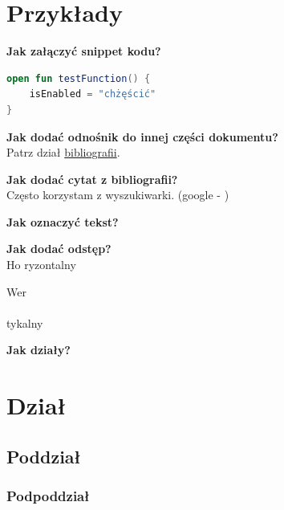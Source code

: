 \section{Przykłady}

\textbf{Jak załączyć snippet kodu?}
\begin{lstlisting}[language=Kotlin]
open fun testFunction() {
    isEnabled = "chżęścić"
}
\end{lstlisting}

\vspace{3em}

\textbf{Jak dodać odnośnik do innej części dokumentu?}\\
Patrz dział \hyperlink{targetName}{bibliografii}.
\hypertarget{targetName}{}

\vspace{3em}

\textbf{Jak dodać cytat z bibliografii?}\\
Często korzystam z wyszukiwarki. (google - \cite{google})

\vspace{3em}

\textbf{Jak oznaczyć tekst?}\\

\vspace{3em}

\textbf{Jak dodać odstęp?}\\

Ho
\hspace{3em}
ryzontalny

Wer\\
\vspace{3em}\\
tykalny

\vspace{3em}

\textbf{Jak działy?}\\

\section{Dział}
\subsection{Poddział}
\subsubsection{Podpoddział}

\newpage

